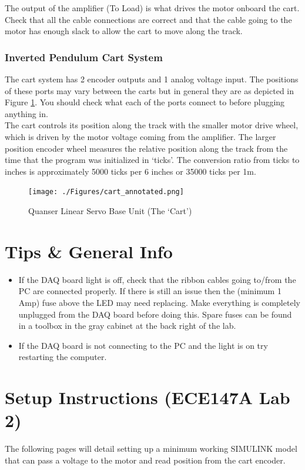\documentclass[11pt,letterpaper]{article}
\begin{document}
The output of the amplifier (To Load) is what drives the motor onboard the cart. Check that all the cable connections are correct and that the cable going to the motor has enough slack to allow the cart to move along the track. 

\subsubsection{Inverted Pendulum Cart System}
The cart system has 2 encoder outputs and 1 analog voltage input. The positions of these ports may vary between the carts but in general they are as depicted in Figure \ref{fig:cart}. You should check what each of the ports connect to before plugging anything in. \\

The cart controls its position along the track with the smaller motor drive wheel, which is driven by the motor voltage coming from the amplifier. The larger position encoder wheel measures the relative position along the track from the time that the program was initialized in `ticks'. The conversion ratio from ticks to inches is approximately 5000 ticks per 6 inches or 35000 ticks per 1m.
\begin{figure}[H]
  \centering
  \texttt{[image: ./Figures/cart\_annotated.png]}
  \caption{Quanser Linear Servo Base Unit (The `Cart')}
  \label{fig:cart}
\end{figure}






\section{Tips \& General Info}
\begin{itemize}
  \item If the DAQ board light is off, check that the ribbon cables going to/from the PC are connected properly. If there is still an issue then the (minimum 1 Amp) fuse above the LED may need replacing. Make everything is completely unplugged from the DAQ board before doing this. Spare fuses can be found in a toolbox in the gray cabinet at the back right of the lab.
  \item If the DAQ board is not connecting to the PC and the light is on try restarting the computer.
\end{itemize}


\section{Setup Instructions (ECE147A Lab 2)}
The following pages will detail setting up a minimum working SIMULINK model that can pass a voltage to the motor and read position from the cart encoder. \\
\end{document}
